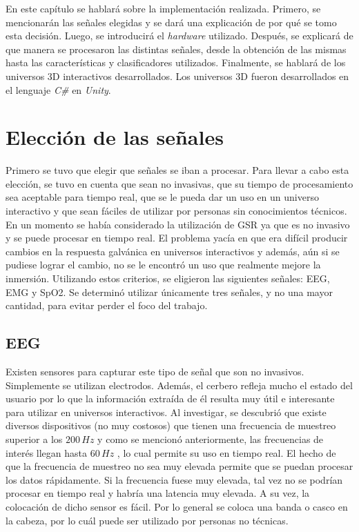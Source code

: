 En este capítulo se hablará sobre la implementación realizada. Primero, se mencionarán las señales elegidas y se dará una explicación de por qué se tomo esta decisión. Luego, se introducirá el \emph{hardware} utilizado. Después, se explicará de que manera se procesaron las distintas señales, desde la obtención de las mismas hasta las características y clasificadores utilizados. Finalmente, se hablará de los universos 3D interactivos desarrollados. Los universos 3D fueron desarrollados en el lenguaje \emph{C\#} en \emph{Unity}.

\section{Elección de las señales}

Primero se tuvo que elegir que señales se iban a procesar. Para llevar a cabo esta elección, se tuvo en cuenta que sean no invasivas, que su tiempo de procesamiento sea aceptable para tiempo real, que se le pueda dar un uso en un universo interactivo y que sean fáciles de utilizar por personas sin conocimientos técnicos. En un momento se había considerado la utilización de GSR ya que es no invasivo y se puede procesar en tiempo real. El problema yacía en que era difícil producir cambios en la respuesta galvánica en universos interactivos y además, aún si se pudiese lograr el cambio, no se le encontró un uso que realmente mejore la inmersión. Utilizando estos criterios, se eligieron las siguientes señales: EEG, EMG y SpO2. Se determinó utilizar únicamente tres señales, y no una mayor cantidad, para evitar perder el foco del trabajo.

\subsection{EEG}

Existen sensores para capturar este tipo de señal que son no invasivos. Simplemente se utilizan electrodos. Además, el cerbero refleja mucho el estado del usuario por lo que la información extraída de él resulta muy útil e interesante para utilizar en universos interactivos. Al investigar, se descubrió que existe  diversos dispositivos (no muy costosos) que tienen una frecuencia de muestreo superior a los $200 \, Hz$ y como se mencionó anteriormente, las frecuencias de interés llegan hasta $60 \, Hz$ , lo cual  permite su uso en tiempo real. El hecho de que la frecuencia de muestreo no sea muy elevada permite que se puedan procesar los datos rápidamente. Si la frecuencia fuese muy elevada, tal vez no se podrían procesar en tiempo real y habría una latencia muy elevada. A su vez, la colocación de dicho sensor es fácil. Por lo general se coloca una banda o casco en la cabeza, por lo cuál puede ser utilizado por personas no técnicas.

